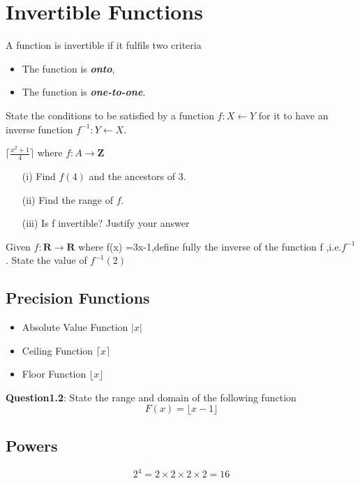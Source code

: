 \documentclass[a4paper,12pt]{article}
\begin{document}
\section{Invertible Functions}
A function is invertible if it fulfils two criteria
\begin{itemize}
\item The function is \textbf{\textit{onto}},
\item The function is \textbf{\textit{one-to-one}}.
\end{itemize}

State the conditions to be satisfied by a function
$f : X \leftarrow Y$ for it to have an inverse function
$f^{-1} : Y \leftarrow X$.

$\lceil \frac{x^2+1}{4} \rceil$
where $f : A \rightarrow \textbf{Z}$
\begin{itemize}
\item[(i)] Find $f(4)$ and the ancestors of 3.
\item[(ii)] Find the range of $f$.
\item[(iii)] Is f invertible? Justify your answer
\end{itemize}

Given $f : \textbf{R} \rightarrow \textbf{R}$ where f(x) =3x-1,define fully
the inverse of the function f ,i.e.$f^{-1}$. 
State the value of $f^{-1}(2)$
\subsection{Precision Functions}

\begin{itemize}
\item Absolute Value Function $| x |$
\item Ceiling Function $\lceil x \rceil$
\item Floor Function  $\lfloor x \rfloor $
\end{itemize}

\noindent \textbf{Question1.2}: State the range and domain of the following function
\[ F(x) = \lfloor x-1 \rfloor \]
\subsection{Powers}

\[  2^ 4 = 2 \times 2 \times 2 \times 2 = 16 \]
\end{document}

